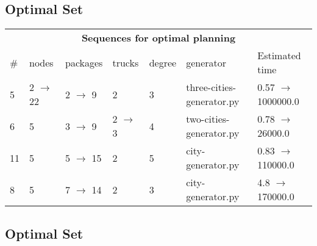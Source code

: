 \documentclass{article}
\begin{document}
                            \subsection*{Optimal Set}

                            \begin{center}
                            \begin{tabular}{l|l|l|l|l|l|l}
                            \multicolumn{7}{c}{\bf \large Sequences for optimal planning}\\
                            \# & nodes & packages & trucks & degree & generator & Estimated time\\\midrule
                            5&2 $\rightarrow$ 22&2 $\rightarrow$ 9&2&3&three-cities-generator.py&0.57 $\rightarrow$ 1000000.0\\
6&5&3 $\rightarrow$ 9&2 $\rightarrow$ 3&4&two-cities-generator.py&0.78 $\rightarrow$ 26000.0\\
11&5&5 $\rightarrow$ 15&2&5&city-generator.py&0.83 $\rightarrow$ 110000.0\\
8&5&7 $\rightarrow$ 14&2&3&city-generator.py&4.8 $\rightarrow$ 170000.0
                            \end{tabular}
                            \end{center}
                    
                                \subsection*{Optimal Set}
                                
\end{document}
